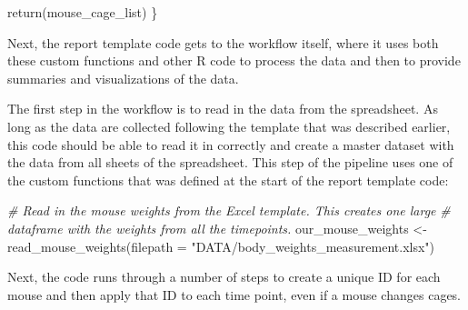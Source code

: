 \documentclass[
]{book}
\newenvironment{Shaded}{\begin{snugshade}}{\end{snugshade}}
\newcommand{\AttributeTok}[1]{\textcolor[rgb]{0.77,0.63,0.00}{#1}}
\newcommand{\CommentTok}[1]{\textcolor[rgb]{0.56,0.35,0.01}{\textit{#1}}}
\newcommand{\FunctionTok}[1]{\textcolor[rgb]{0.00,0.00,0.00}{#1}}
\newcommand{\NormalTok}[1]{#1}
\newcommand{\OtherTok}[1]{\textcolor[rgb]{0.56,0.35,0.01}{#1}}
\newcommand{\StringTok}[1]{\textcolor[rgb]{0.31,0.60,0.02}{#1}}
\begin{document}
\begin{Shaded}
\begin{Highlighting}[]
  \FunctionTok{return}\NormalTok{(mouse\_cage\_list)}
\NormalTok{\}}
\end{Highlighting}
\end{Shaded}

Next, the report template code gets to the workflow itself, where it uses
both these custom functions and other R code to process the data and then
to provide summaries and visualizations of the data.

The first step in the workflow is to read in the data from the spreadsheet.
As long as the data are collected following the template that was described
earlier, this code should be able to read it in correctly and create a
master dataset with the data from all sheets of the spreadsheet. This step
of the pipeline uses one of the custom functions that was defined at the start
of the report template code:

\begin{Shaded}
\begin{Highlighting}[]
\CommentTok{\# Read in the mouse weights from the Excel template. This creates one large}
\CommentTok{\# dataframe with the weights from all the timepoints. }
\NormalTok{our\_mouse\_weights }\OtherTok{\textless{}{-}} \FunctionTok{read\_mouse\_weights}\NormalTok{(}\AttributeTok{filepath =}
                                          \StringTok{"DATA/body\_weights\_measurement.xlsx"}\NormalTok{)}
\end{Highlighting}
\end{Shaded}

Next, the code runs through a number of steps to create a unique ID for
each mouse and then apply that ID to each time point, even if a mouse
changes cages.
\end{document}
